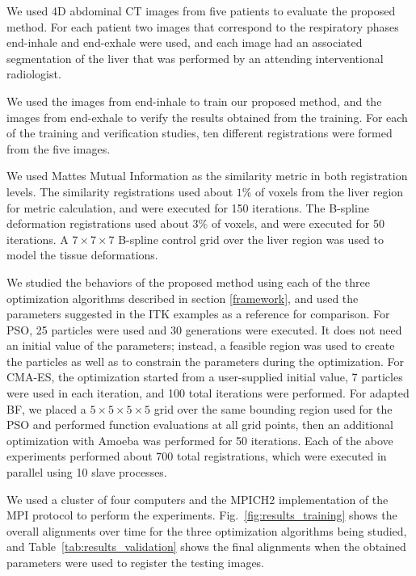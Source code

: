 \documentclass[]{spie}  %
\begin{document}
We used 4D abdominal CT images from five patients to evaluate the proposed method. For each patient two images that correspond to the respiratory phases end-inhale and end-exhale were used, and each image had an associated segmentation of the liver that was performed by an attending interventional radiologist. 

We used the images from end-inhale to train our proposed method, and the images from end-exhale to verify the results obtained from the training. For each of the training and verification studies, ten different registrations were formed from the five images.

We used Mattes Mutual Information \cite{Mattes03:TMI} as the similarity metric in both registration levels. The similarity registrations used about $1\%$ of voxels from the liver region for metric calculation, and were executed for 150 iterations. The B-spline deformation registrations used about $3\%$ of voxels, and were executed for 50 iterations. A $7 \times 7 \times 7$ B-spline control grid over the liver region was used to model the tissue deformations.

We studied the behaviors of the proposed method using each of the three optimization algorithms described in section \ref{framework}, and used the parameters suggested in the ITK examples as a reference for comparison. 
For PSO, 25 particles were used and 30 generations were executed. It does not need an initial value of the parameters; instead, a feasible region was used to create the particles as well as to constrain the parameters during the optimization. 
For CMA-ES, the optimization started from a user-supplied initial value, 7 particles were used in each iteration, and 100 total iterations were performed. 
For adapted BF, we placed a $5 \times 5 \times 5 \times 5$ grid over the same bounding region used for the PSO and performed function evaluations at all grid points, then an additional optimization with Amoeba was performed for 50 iterations. Each of the above experiments performed about 700 total registrations, which were executed in  parallel using 10 slave processes.

We used a cluster of four computers and the MPICH2 implementation of the MPI protocol to perform the experiments. Fig.~\ref{fig:results_training} shows the overall alignments over time for the three optimization algorithms being studied, and Table~\ref{tab:results_validation} shows the final alignments when the obtained parameters were used to register the testing images.
\end{document}
